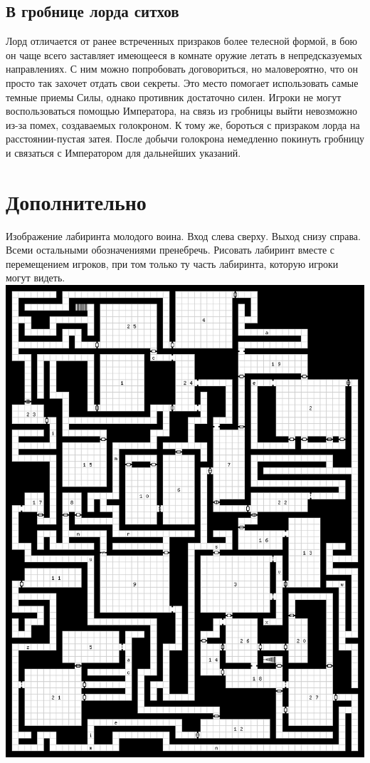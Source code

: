 \documentclass{article}
\begin{document}
\subsection{В гробнице лорда ситхов}
\begin{myquote}
\color{sw}

\end{myquote}
Лорд отличается от ранее встреченных призраков более телесной формой, в бою он чаще всего заставляет имеющееся в комнате оружие летать в непредсказуемых направлениях.
С ним можно попробовать договориться, но маловероятно, что он просто так захочет отдать свои секреты.
Это место помогает использовать самые темные приемы Силы, однако противник достаточно силен.
Игроки не могут воспользоваться помощью Императора, на связь из гробницы выйти невозможно из-за помех, создаваемых голокроном. К тому же, бороться с призраком лорда на расстоянии-пустая затея.
После добычи голокрона немедленно покинуть гробницу и связаться с Императором для дальнейших указаний.

\section{Дополнительно}
\label{5000}
Изображение лабиринта молодого воина.
Вход слева сверху.
Выход снизу справа.
Всеми остальными обозначениями пренебречь.
Рисовать лабиринт вместе с перемещением игроков, при том только ту часть лабиринта, которую игроки могут видеть.
\newline
\includegraphics[width=1\textwidth]{imgs/labirint} \label{lab_img}
\end{document}
